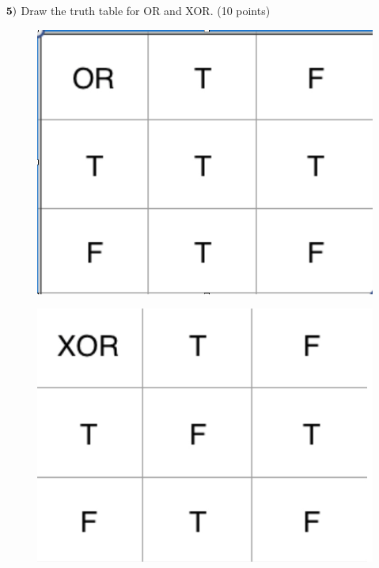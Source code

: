 \documentclass{article}
\begin{document}
  $\bf{5)}$ Draw the truth table for OR and XOR.  (10 points)
   \vspace{0.5cm}
\begin{figure}[h!]
\centering
\includegraphics[scale=0.3]{1.jpg}
\lable[NO.1]
\label{fig:1}
\end{figure}
\begin{figure}[h!]
\centering
\includegraphics[scale=0.3]{2.jpg}
\lable[NO.2]
\label{fig:1}
\end{figure}
   \begin{verbatim}
   
   
  \end{verbatim}
   
\end{document}
